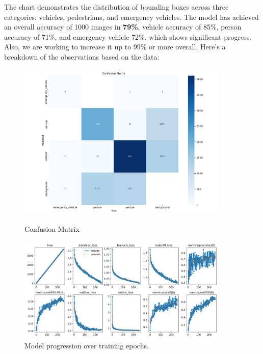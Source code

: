 \documentclass[conference]{IEEEtran}
\begin{document}
The chart demonstrates the distribution of bounding boxes across three categories: vehicles, pedestrians, and emergency vehicles. The model has achieved an overall accuracy of 1000 images in \textbf{79\%}, vehicle accuracy of 85\%, person accuracy of 71\%, and emergency vehicle 72\%. which shows significant progress. Also, we are working to increase it up to 99\% or more overall.  Here's a breakdown of the observations based on the data:
\begin{figure}
    \centering
    \begin{minipage}{0.5\textwidth}
        \centering
        \includegraphics[width=0.9\textwidth]{14.png}
        \caption{Confusion Matrix}
        \label{fig:f7}
    \end{minipage}%
    \hfill %
    \vspace{1cm}
    \begin{minipage}{0.5\textwidth}
        \centering
        \includegraphics[width=0.9\textwidth]{15.png}
        \caption{Model progression over training epochs.}
        \label{fig:f8}
    \end{minipage}
\end{figure}
\end{document}
